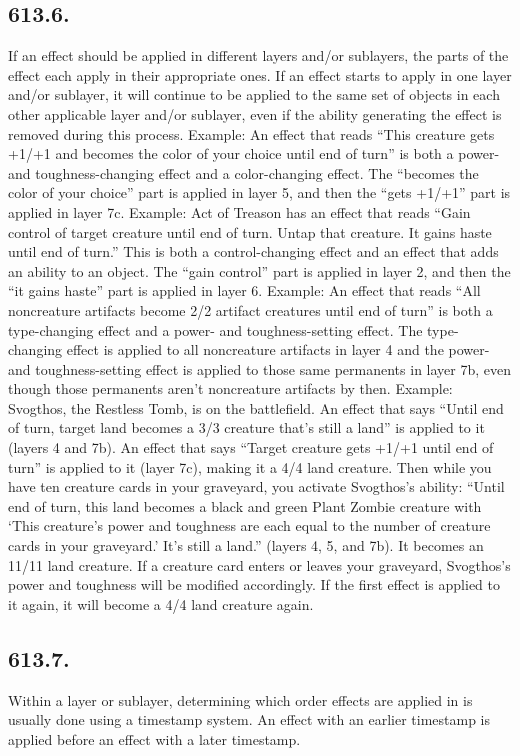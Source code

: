 \subsection*{613.6.}
If an effect should be applied in different layers and/or sublayers, the parts of the effect each apply in their appropriate ones. If an effect starts to apply in one layer and/or sublayer, it will continue to be applied to the same set of objects in each other applicable layer and/or sublayer, even if the ability generating the effect is removed during this process.
Example: An effect that reads “This creature gets +1/+1 and becomes the color of your choice until end of turn” is both a power- and toughness-changing effect and a color-changing effect. The “becomes the color of your choice” part is applied in layer 5, and then the “gets +1/+1” part is applied in layer 7c.
Example: Act of Treason has an effect that reads “Gain control of target creature until end of turn. Untap that creature. It gains haste until end of turn.” This is both a control-changing effect and an effect that adds an ability to an object. The “gain control” part is applied in layer 2, and then the “it gains haste” part is applied in layer 6.
Example: An effect that reads “All noncreature artifacts become 2/2 artifact creatures until end of turn” is both a type-changing effect and a power- and toughness-setting effect. The type-changing effect is applied to all noncreature artifacts in layer 4 and the power- and toughness-setting effect is applied to those same permanents in layer 7b, even though those permanents aren’t noncreature artifacts by then.
Example: Svogthos, the Restless Tomb, is on the battlefield. An effect that says “Until end of turn, target land becomes a 3/3 creature that’s still a land” is applied to it (layers 4 and 7b). An effect that says “Target creature gets +1/+1 until end of turn” is applied to it (layer 7c), making it a 4/4 land creature. Then while you have ten creature cards in your graveyard, you activate Svogthos’s ability: “Until end of turn, this land becomes a black and green Plant Zombie creature with ‘This creature’s power and toughness are each equal to the number of creature cards in your graveyard.’ It’s still a land.” (layers 4, 5, and 7b). It becomes an 11/11 land creature. If a creature card enters or leaves your graveyard, Svogthos’s power and toughness will be modified accordingly. If the first effect is applied to it again, it will become a 4/4 land creature again.

\subsection*{613.7.}
Within a layer or sublayer, determining which order effects are applied in is usually done using a timestamp system. An effect with an earlier timestamp is applied before an effect with a later timestamp.


